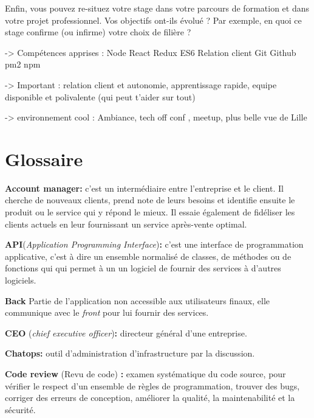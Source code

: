 \documentclass[12pt,a4paper]{article}
\begin{document}
  \bigskip

  Enfin, vous pouvez re-situez votre stage dans votre parcours de
  formation et dans votre projet professionnel. Vos objectifs ont-ils
  évolué ? Par exemple, en quoi ce stage confirme (ou infirme) votre choix
  de filière ?

  -\textgreater{} Compétences apprises : Node React Redux ES6 Relation
  client Git Github pm2 npm

  -\textgreater{} Important : relation client et autonomie, apprentissage
  rapide, equipe disponible et polivalente (qui peut t'aider sur tout)

  -\textgreater{} environnement cool : Ambiance, tech off conf , meetup,
  plus belle vue de Lille

  \newpage

  \section{Glossaire}\label{glossaire}

  \textbf{Account manager:} c'est un intermédiaire entre l'entreprise et
  le client. Il cherche de nouveaux clients, prend note de leurs besoins
  et identifie ensuite le produit ou le service qui y répond le mieux. Il
  essaie également de fidéliser les clients actuels en leur fournissant un
  service après-vente optimal.

  \bigskip

  \textbf{API}(\emph{Application Programming Interface})\textbf{:} c'est
  une interface de programmation applicative, c'est à dire un ensemble
  normalisé de classes, de méthodes ou de fonctions qui qui permet à un un
  logiciel de fournir des services à d'autres logiciels.

  \bigskip

  \textbf{Back} Partie de l'application non accessible aux utilisateurs
  finaux, elle communique avec le \emph{front} pour lui fournir des
  services.

  \bigskip

  \textbf{CEO} (\emph{chief executive officer})\textbf{:} directeur
  général d'une entreprise.

  \bigskip

  \textbf{Chatops:} outil d'administration d'infrastructure par la
  discussion.

  \bigskip

  \textbf{Code review} (Revu de code) \textbf{:} examen systématique du
  code source, pour vérifier le respect d'un ensemble de règles de
  programmation, trouver des bugs, corriger des erreurs de conception,
  améliorer la qualité, la maintenabilité et la sécurité.
\end{document}
